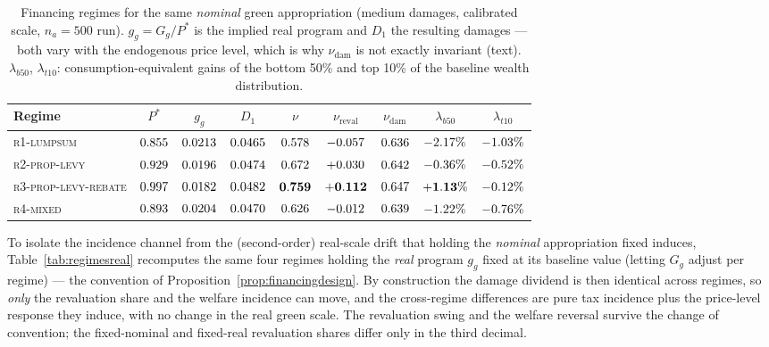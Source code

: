 \documentclass[12pt]{article}
\begin{document}
\begin{table}[!htb]
\centering
\caption{Financing regimes for the same \emph{nominal} green appropriation
(medium damages, calibrated scale, $n_a=500$ run). $g_g=G_g/P^{*}$ is the
implied real program and $D_1$ the resulting damages --- both vary with the
endogenous price level, which is why $\nu_{\mathrm{dam}}$ is not exactly
invariant (text). $\lambda_{b50}$, $\lambda_{t10}$: consumption-equivalent
gains of the bottom 50\% and top 10\% of the baseline wealth distribution.}
\label{tab:regimes}
\footnotesize
\setlength{\tabcolsep}{4pt}
\begin{tabular}{lcccccccc}
\toprule
Regime & $P^{*}$ & $g_g$ & $D_1$ & $\nu$ & $\nu_{\mathrm{reval}}$ & $\nu_{\mathrm{dam}}$ &
$\lambda_{b50}$ & $\lambda_{t10}$ \\
\midrule
\textsc{r1-lumpsum}      & $0.855$ & $0.0213$ & $0.0465$ & $0.578$ & $-0.057$ & $0.636$ & $-2.17\%$ & $-1.03\%$ \\
\textsc{r2-prop-levy}               & $0.929$ & $0.0196$ & $0.0474$ & $0.672$ & $+0.030$ & $0.642$ & $-0.36\%$ & $-0.52\%$ \\
\textsc{r3-prop-levy-rebate}        & $0.997$ & $0.0182$ & $0.0482$ & $\mathbf{0.759}$ & $\mathbf{+0.112}$ & $0.647$ & $\mathbf{+1.13\%}$ & $-0.12\%$ \\
\textsc{r4-mixed}      & $0.893$ & $0.0204$ & $0.0470$ & $0.626$ & $-0.012$ & $0.639$ & $-1.22\%$ & $-0.76\%$ \\
\bottomrule
\end{tabular}
\end{table}

To isolate the incidence channel from the (second-order) real-scale drift that
holding the \emph{nominal} appropriation fixed induces, Table~\ref{tab:regimesreal}
recomputes the same four regimes holding the \emph{real} program $g_g$ fixed at
its baseline value (letting $G_g$ adjust per regime) --- the convention of
Proposition~\ref{prop:financingdesign}. By construction the damage dividend is
then identical across regimes, so \emph{only} the revaluation share and the
welfare incidence can move, and the cross-regime differences are pure tax
incidence plus the price-level response they induce, with no change in the real
green scale. The revaluation swing and the welfare reversal survive the change
of convention; the fixed-nominal and fixed-real revaluation shares differ only
in the third decimal.
\end{document}
